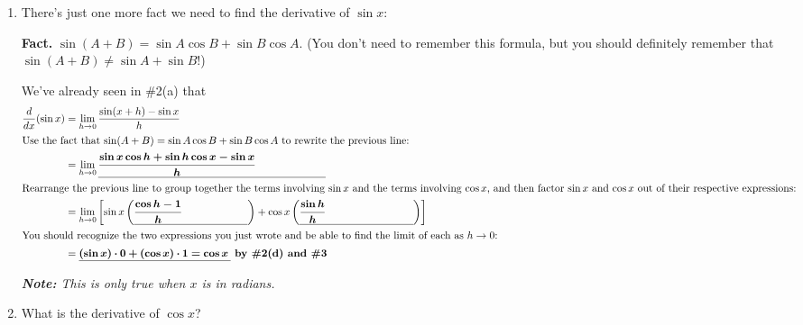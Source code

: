 \documentclass[main]{subfiles}
\begin{document}
\begin{enumerate}[resume]

\item 
  There's just one more fact we need to find the derivative of $\sin x$:

  \begin{framed}
    \textbf{Fact.} $\sin(A + B) = \sin A \cos B + \sin B \cos A$.  (You
    don't need to remember this formula, but you should definitely remember
    that $\sin(A + B) \neq \sin A + \sin B$!)
  \end{framed}

  We've already seen in {{{{\#2}}(a)}} that
  \begin{align*}
    \frac{d}{dx} (\sin x) &= \lim_{h \to 0}\frac{\sin (x +
      h) - \sin x}{h} \\
    \intertext{Use the fact that $\sin(A + B) = \sin A \cos B + \sin B
      \cos A$ to rewrite the previous line:} %
    &= \lim_{h \to 0} \fitb[\vphantom{\dfrac{a}{b}}]{3in}{\displaystyle
      \frac{\sin x \cos h + \sin h \cos x -
        \sin x}{h}} \\
    \intertext{Rearrange the previous line to group together the terms
      involving $\sin x$ and the terms involving $\cos x$, and then factor
      $\sin x$ and $\cos x$ out of their respective expressions:} %
    &= \lim_{h \to 0} \left[ \sin x \left(
        \fitb[\vphantom{\dfrac{a}{b}}]{1.5in}{\displaystyle \frac{\cos h -
            1}{h}} \right) + \cos x \left(
        \fitb[\vphantom{\dfrac{a}{b}}]{1.5in}{\displaystyle \frac{\sin
            h}{h}} \right) \right] \\
    \intertext{You should recognize the two expressions you just wrote and
      be able to find the limit of each as $h \to 0$:}%
    &= \fitb[\vphantom{\dfrac{a}{b}}]{2in}{(\sin x) \cdot 0 + (\cos x)
      \cdot 1 = \cos x} \solonly{\text{\textbf{ by
          {{{{\#2}}(d)}} and {{\#3}}}}}
  \end{align*}
  \begin{framed}
    \emph{\textbf{Note:} This is only true when $x$ is in radians.}
  \end{framed}


\item 
  \begin{problem}[\vfill]
    What is the derivative of $\cos x$?
  \end{problem}


\end{enumerate}
\end{document}
